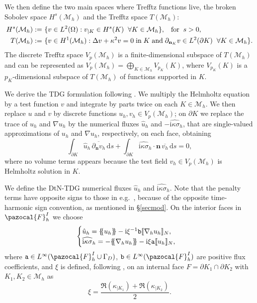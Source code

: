 \documentclass[a4paper,10pt]{article}
\newcommand{\dlgraffa}{\{ \hspace{-0.1cm} \{}
\newcommand{\drgraffa}{\} \hspace{-0.1cm} \}}
\newcommand{\bn}{{\mathbf n}}
\newcommand{\ri}{{\mathrm i}}
\newcommand{\rd}{{\,\mathrm d}}
\newcommand{\Mh}{{\mathcal M_h}}
\newcommand{\pa}{{\mathtt{a}}}
\newcommand{\pb}{{\mathtt{b}}}
\newcommand{\dnK}{{\partial_{\bn_K}}}
\newcommand{\FhI}{\pazocal{F}_h^I}
\begin{document}
	We then define the two main spaces where Trefftz functions live, the broken Sobolev space $H^s(\Mh)$ and the Trefftz space $T(\Mh)$:
	\begin{align} \label{broken_sob}
H^s(\Mh) :=&\ \{ v \in L^2(\Omega) : v_{| K}\in H^s(K) \hspace{0.2cm} \forall K \in \Mh \}, \hspace{0.3cm} \text{for} \hspace{0.2cm} s>0, \\ 
T(\Mh) :=&\ \{ v \in H^1(\Mh) : \Delta v + \kappa^2v = 0 \; \text{in} \; K \; \text{and} \; \dnK v \in L^2(\partial K) \hspace{0.2cm}\forall K \in \Mh \}. \nonumber
\end{align}
The discrete Trefftz space $V_p(\Mh)$ is a finite-dimensional subspace of $T(\Mh)$ and can be represented as $V_p(\Mh) = \bigoplus_{K \in \Mh}V_{p_K}(K)$, where $V_{p_K}(K)$ is a $p_K$-dimensional subspace of $T(\Mh)$ of functions supported in $K$.

We derive the TDG formulation following \cite{Hiptmair2011}.
We multiply the Helmholtz equation by a test function $v$ and integrate by parts twice on each $K\in\Mh$. We then replace $u$ and $v$ by discrete functions $u_h, v_h \in V_p(\Mh)$; on $\partial K$ we replace the trace of $u_h$ and $\nabla u_h$ by the numerical fluxes $\hat{u}_h$ and $-\widehat{\ri\kappa\sigma}_h$, that are single-valued approximations of $u_h$ and $\nabla u_h$, respectively, on each face, obtaining %
\begin{equation} \label{TDG}
\int_{\partial K} \hat{u}_h \, \overline{\partial_\bn v_h}  \rd s 
+ \int_{\partial K} \widehat{\ri\kappa\sigma}_h \cdot \bn \, \overline{v_h}  \rd s = 0,
\end{equation}
where no volume terms appears because the test field $v_h\in V_p(\Mh)$ is Helmholtz solution in $K$.


We define the DtN-TDG numerical fluxes
$\hat u_h$ and $\widehat{\ri\kappa\sigma}_h$. 
Note that the penalty terms have opposite signs to those in e.g.\ \cite{Hiptmair2011}, because of the opposite time-harmonic sign convention, as mentioned in \S\ref{secmod}.
On the interior faces in $\FhI$ we choose
\begin{equation*}
\begin{cases}
	\hat{u}_h = \dlgraffa u_h\drgraffa  -\ri \xi^{-1}\pb
	\llbracket \nabla_h u_h  \rrbracket_N, & \\
	\widehat{\ri\kappa\sigma}_h = - \dlgraffa \nabla_h u_h\drgraffa  - \ri \xi \pa  \llbracket u_h  \rrbracket_N, & 
\end{cases}
\end{equation*}
where  $\pa\in L^\infty(\FhI\cup \Gamma_D)$, $\pb\in L^\infty(\FhI)$ are positive flux coefficients, and $\xi$ is defined,  following \cite[\S3.3]{Howarth2014}, on an internal face $F=\partial K_1\cap\partial K_2$ with $K_1,K_2\in\Mh$ as
\begin{equation} \label{xi_2}
\xi = {\frac{\Re (\kappa_{|K_1}) + \Re (\kappa_{|K_2})}2.}
\end{equation}
\end{document}
